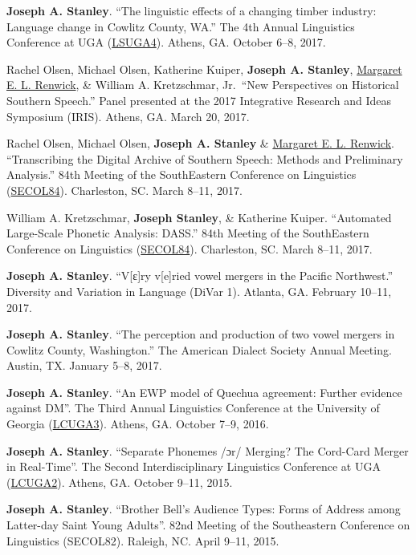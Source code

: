 \documentclass[
]{article}
\begin{document}
\textbf{Joseph A. Stanley}. ``The linguistic effects of a changing
timber industry: Language change in Cowlitz County, WA.'' The 4th Annual
Linguistics Conference at UGA
(\href{http://www.linguistics.uga.edu/lcuga-4}{LSUGA4}). Athens, GA.
October 6--8, 2017.

Rachel Olsen, Michael Olsen, Katherine Kuiper, \textbf{Joseph A.
Stanley}, \href{http://faculty.franklin.uga.edu/mrenwick/}{Margaret E.
L. Renwick}, \& William A. Kretzschmar, Jr.~``New Perspectives on
Historical Southern Speech.'' Panel presented at the 2017 Integrative
Research and Ideas Symposium (IRIS). Athens, GA. March 20, 2017.

Rachel Olsen, Michael Olsen, \textbf{Joseph A. Stanley} \&
\href{http://faculty.franklin.uga.edu/mrenwick/}{Margaret E. L.
Renwick}. ``Transcribing the Digital Archive of Southern Speech: Methods
and Preliminary Analysis.'' 84th Meeting of the SouthEastern Conference
on Linguistics (\href{http://conf2017.secol.org}{SECOL84}). Charleston,
SC. March 8--11, 2017.

William A. Kretzschmar, \textbf{Joseph Stanley}, \& Katherine Kuiper.
``Automated Large-Scale Phonetic Analysis: DASS.'' 84th Meeting of the
SouthEastern Conference on Linguistics
(\href{http://conf2017.secol.org}{SECOL84}). Charleston, SC. March
8--11, 2017.

\textbf{Joseph A. Stanley}. ``V{[}ɛ{]}ry v{[}e{]}ried vowel mergers in
the Pacific Northwest.'' Diversity and Variation in Language (DiVar 1).
Atlanta, GA. February 10--11, 2017.

\textbf{Joseph A. Stanley}. ``The perception and production of two vowel
mergers in Cowlitz County, Washington.'' The American Dialect Society
Annual Meeting. Austin, TX. January 5--8, 2017.

\textbf{Joseph A. Stanley}. ``An EWP model of Quechua agreement: Further
evidence against DM''. The Third Annual Linguistics Conference at the
University of Georgia
(\href{https://www.linguistics.uga.edu/lcuga-3}{LCUGA3}). Athens, GA.
October 7--9, 2016.

\textbf{Joseph A. Stanley}. ``Separate Phonemes /ɔr/ Merging? The
Cord-Card Merger in Real-Time''. The Second Interdisciplinary
Linguistics Conference at UGA
(\href{https://www.linguistics.uga.edu/lcuga-2}{LCUGA2}). Athens, GA.
October 9--11, 2015.

\textbf{Joseph A. Stanley}. ``Brother Bell's Audience Types: Forms of
Address among Latter-day Saint Young Adults''. 82nd Meeting of the
Southeastern Conference on Linguistics (SECOL82). Raleigh, NC. April
9--11, 2015.
\end{document}
